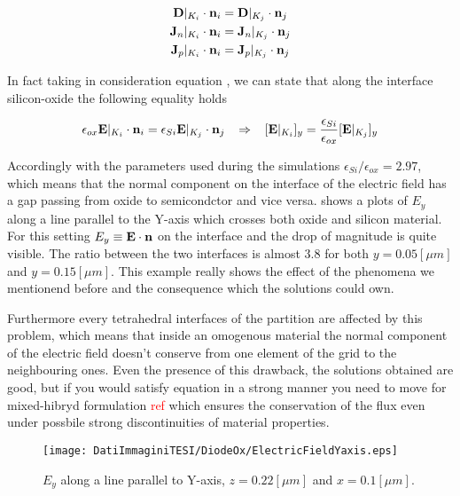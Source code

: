 \begin{align}
\mathbf{D}|_{K_i}\cdot \mathbf{n}_{i} & = \mathbf{D}|_{K_j} \cdot \mathbf{n}_{j} \label{eq: conservazione vettore spostamento}\\
\mathbf{J}_n|_{K_i}\cdot \mathbf{n}_{i} & = \mathbf{J}_n|_{K_j}\cdot \mathbf{n}_{j} \\
\mathbf{J}_p|_{K_i}\cdot \mathbf{n}_{i} & = \mathbf{J}_p|_{K_j}\cdot \mathbf{n}_{j} 
\end{align}


In fact taking in consideration equation , we can state that along the interface silicon-oxide the following equality holds

\begin{equation}
\epsilon_{ox}\vect{E}|_{K_i}\cdot \vect{n}_{i} = \epsilon_{Si}\vect{E}|_{K_j} \cdot \vect{n}_{j} \psp{5} \Rightarrow \psp{5}  [\vect{E}|_{K_i}]_y = \dfrac{\epsilon_{Si}}{\epsilon_{ox}}[\vect{E}|_{K_j}]_y
\end{equation}  

Accordingly with the parameters used during the simulations $\epsilon_{Si}/\epsilon_{ox}=2.97$, which means that the normal component on the interface of the electric field has a gap passing from oxide to semicondctor and vice versa.  shows a plots of $E_y$ along a line parallel to the Y-axis which crosses both oxide and silicon material. For this setting $E_y\equiv\mathbf{E}\cdot \mathbf{n}$ on the interface and the drop of magnitude is quite visible. The ratio between the two interfaces is almost $3.8$ for both $y=0.05[\mu m]$ and $y = 0.15[\mu m]$.
This example really shows the effect of the phenomena we mentionend before and the consequence which the solutions could own.

 Furthermore every tetrahedral interfaces of the partition are affected by this problem, which means that inside an omogenous material the normal component of the electric field doesn't conserve from one element of the grid to the neighbouring ones. Even the presence of this drawback, the solutions obtained are good, but if you would satisfy equation  in a strong manner you need to move for mixed-hibryd formulation \textcolor{red}{ref} which ensures the conservation of the flux even under possbile strong discontinuities of material properties.


\begin{figure}[!h]
\centering
\texttt{[image: DatiImmaginiTESI/DiodeOx/ElectricFieldYaxis.eps]}
\caption{$E_y$ along a line parallel to Y-axis, $z=0.22[\mu m]$ and $x=0.1[\mu m]$.}
\label{fig: salto electric field}
\end{figure}


